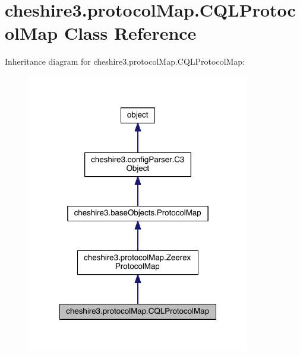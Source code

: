 \hypertarget{classcheshire3_1_1protocol_map_1_1_c_q_l_protocol_map}{\section{cheshire3.\-protocol\-Map.\-C\-Q\-L\-Protocol\-Map Class Reference}
\label{classcheshire3_1_1protocol_map_1_1_c_q_l_protocol_map}
}


Inheritance diagram for cheshire3.\-protocol\-Map.\-C\-Q\-L\-Protocol\-Map\-:
\nopagebreak
\begin{figure}[H]
\begin{center}
\leavevmode
\includegraphics[width=276pt]{classcheshire3_1_1protocol_map_1_1_c_q_l_protocol_map__inherit__graph}
\end{center}
\end{figure}


